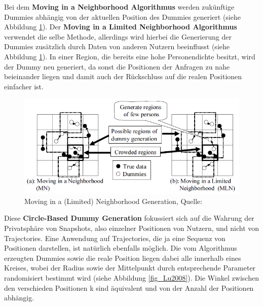 Bei dem \textbf{Moving in a Neighborhood Algorithmus} \cite{Kido2005} werden zukünftige Dummies abhängig von der aktuellen Position des Dummies generiert (siehe Abbildung \ref{fig_Kido2005DG}). Der \textbf{Moving in a Limited Neighborhood Algorithmus} \cite{Kido2005} verwendet die selbe Methode, allerdings wird hierbei die Generierung der Dummies zusätzlich durch Daten von anderen Nutzern beeinflusst (siehe Abbildung \ref{fig_Kido2005DG}). In einer Region, die bereits eine hohe Personendichte besitzt, wird der Dummy neu generiert, da sonst die Positionen der Anfragen zu nahe beieinander liegen und damit auch der Rückschluss auf die realen Positionen einfacher ist.
\begin{figure}[!h]
	\centering
	\includegraphics[width=\linewidth]{Bilder/Kido2005DG.png}
	\caption{Moving in a (Limited) Neighborhood Generation, Quelle: \protect\cite{Kido2005}}
	\label{fig_Kido2005DG}
\end{figure}

Diese \textbf{Circle-Based Dummy Generation} \cite{Lu2008} fokussiert sich auf die Wahrung der Privatsphäre von Snapshots, also einzelner Positionen von Nutzern, und nicht von Trajectories. Eine Anwendung auf Trajectories, die ja eine Sequenz von Positionen darstellen, ist natürlich ebenfalls möglich. Die vom Algorithmus erzeugten Dummies sowie die reale Position liegen dabei alle innerhalb eines Kreises, wobei der Radius sowie der Mittelpunkt durch entsprechende Parameter randomisiert bestimmt wird (siehe Abbildung \ref{fig_Lu2008}). Die Winkel zwischen den verschieden Positionen k sind äquivalent und von der Anzahl der Positionen abhängig.

